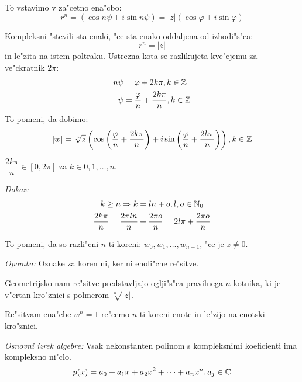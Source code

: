 To vstavimo v za"cetno ena"cbo:
\begin{equation*}
r^n = (\cos n \psi + i \sin n \psi) = |z|(\cos \varphi + i \sin \varphi)
\end{equation*}

Kompleksni "stevili sta enaki, "ce sta enako oddaljena od izhodi"s"ca:
\begin{equation*}
r^n = |z|
\end{equation*}
in le"zita na istem poltraku. Ustrezna kota se razlikujeta kve"cjemu za ve"ckratnik $2\pi$:
\begin{align*}
n\psi &= \varphi + 2k\pi, k \in \mathbb{Z}\\
\psi &= \dfrac{\varphi}{n} + \dfrac{2k\pi}{n}, k \in \mathbb{Z}
\end{align*}
To pomeni, da dobimo:
\begin{equation*}
|w| = \sqrt[n]{z}\left(\cos \left(\dfrac{\varphi}{n} + \dfrac{2k\pi}{n}\right) + i \sin \left(\dfrac{\varphi}{n} + \dfrac{2k\pi}{n}\right)\right), k \in \mathbb{Z}
\end{equation*}

$\dfrac{2k\pi}{n} \in [0, 2\pi]$ za $k \in {0, 1, \ldots ,n}$.

\emph{Dokaz:}\\
\begin{gather*}
k \geq n \Rightarrow k = ln + o, l, o \in \mathbb{N}_0\\
\dfrac{2k\pi}{n} = \dfrac{2\pi ln}{n} + \dfrac{2\pi o}{n} = 2l\pi + \dfrac{2\pi o}{n}
\end{gather*}

To pomeni, da so razli"cni $n$-ti koreni: $w_0, w_1, \ldots, w_{n-1}$, "ce je $z \neq 0$.

\emph{Opomba:} Oznake za koren ni, ker ni enoli"cne re"sitve.

Geometrijsko nam re"sitve predstavljajo oglji"s"ca pravilnega $n$-kotnika, ki je v"crtan kro"znici s polmerom $\sqrt[n]{|z|}$.

Re"sitvam ena"cbe $w^n = 1$ re"cemo $n$-ti koreni enote in le"zijo na enotski kro"znici.

\emph{Osnovni izrek algebre:} Vsak nekonstanten polinom s kompleksnimi koeficienti ima kompleksno ni"clo.
\begin{equation*}
p(x) = a_0 + a_1 x + a_2 x^2 + \cdots + a_n x^n, a_j \in \mathbb{C}
\end{equation*}